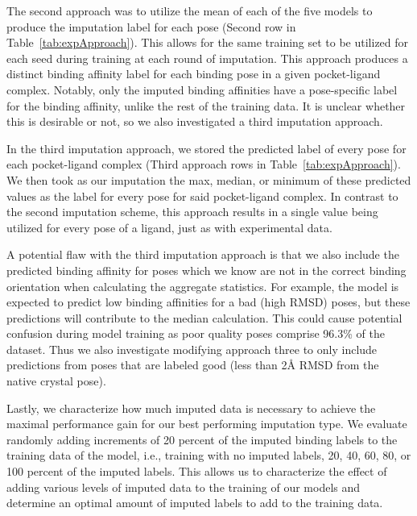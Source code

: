 \documentclass[journal=jmcmar,manuscript=article]{achemso}
\begin{document}
The second approach was to utilize the mean of each of the five models to produce the imputation label for each pose (Second row in Table~\ref{tab:expApproach}).
This allows for the same training set to be utilized for each seed during training at each round of imputation.
This approach produces a distinct binding affinity label for each binding pose in a given pocket-ligand complex.
Notably, only the imputed binding affinities have a pose-specific label for the binding affinity, unlike the rest of the training data.
It is unclear whether this is desirable or not, so we also investigated a third imputation approach.

In the third imputation approach, we stored the predicted label of every pose for each pocket-ligand complex (Third approach rows in Table~\ref{tab:expApproach}).
We then took as our imputation the max, median, or minimum of these predicted values as the label for every pose for said pocket-ligand complex.
In contrast to the second imputation scheme, this approach results in a single value being utilized for every pose of a ligand, just as with experimental data.

A potential flaw with the third imputation approach is that we also include the predicted binding affinity for poses which we know are not in the correct binding orientation when calculating the aggregate statistics.  For example, the model is expected to predict low binding affinities for a bad (high RMSD) poses, but these predictions will contribute to the median calculation.
This could cause potential confusion during model training as poor quality poses  comprise 96.3\% of the dataset.
Thus we also investigate modifying approach three to only include predictions from poses that are labeled good (less than 2{\AA} RMSD from the native crystal pose).

Lastly, we characterize how much imputed data is necessary to achieve the maximal performance gain for our best performing imputation type.
We evaluate randomly adding increments of 20 percent of the imputed binding labels to the training data of the model, i.e., training with no imputed labels, 20, 40, 60, 80, or 100 percent of the imputed labels.
This allows us to characterize the effect of adding various levels of imputed data to the training of our models and determine an optimal amount of imputed labels to add to the training data.
\end{document}
